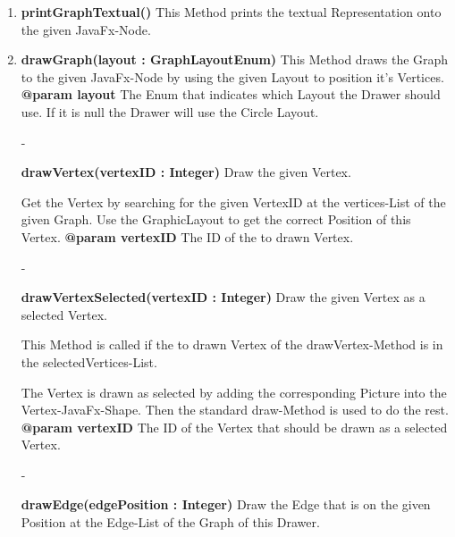 \documentclass{article}
\begin{document}
\begin{enumerate}
{\begin{enumerate}[+]
{						Sets the given Graph and fxNode.
						Also initializes the ColourManager.
						\newline
						\textbf{@param graph}
							The Graph that should be set as the Graph of this Drawer.
							\newline
						\textbf{@param fxNode}
							The JavaFx-Node that should be set as the fxNode of this Class.
							\newline
					}
					\item{
						\textbf{printGraphTextual()} \newline
						This Method prints the textual Representation onto the given JavaFx-Node.
						\newline
					}
					\item{
						\textbf{drawGraph(layout : GraphLayoutEnum)} \newline
						This Method draws the Graph to the given JavaFx-Node by using the given Layout to position it's Vertices.
						\newline
						\textbf{@param layout}
							The Enum that indicates which Layout the Drawer should use.
							If it is null the Drawer will use the Circle Layout.
							\newline
					}
					\item[-]{
						\textbf{drawVertex(vertexID : Integer)} \newline
						Draw the given Vertex.
						
						Get the Vertex by searching for the given VertexID at the vertices-List of the given Graph.
						Use the GraphicLayout to get the correct Position of this Vertex.
						\newline
						\textbf{@param vertexID}
							The ID of the to drawn Vertex.
							\newline
					}
					\item[-]{
						\textbf{drawVertexSelected(vertexID : Integer)} \newline
						Draw the given Vertex as a selected Vertex.
						
						This Method is called if the to drawn Vertex of the drawVertex-Method is in the selectedVertices-List.
						
						The Vertex is drawn as selected by adding the corresponding Picture into the Vertex-JavaFx-Shape.
						Then the standard draw-Method is used to do the rest.
						\newline
						\textbf{@param vertexID}
						The ID of the Vertex that should be drawn as a selected Vertex.
						\newline
					}
					\item[-]{
						\textbf{drawEdge(edgePosition : Integer)} \newline
						Draw the Edge that is on the given Position at the Edge-List of the Graph of this Drawer.
						
}
\end{enumerate}}
\end{enumerate}
\end{document}
